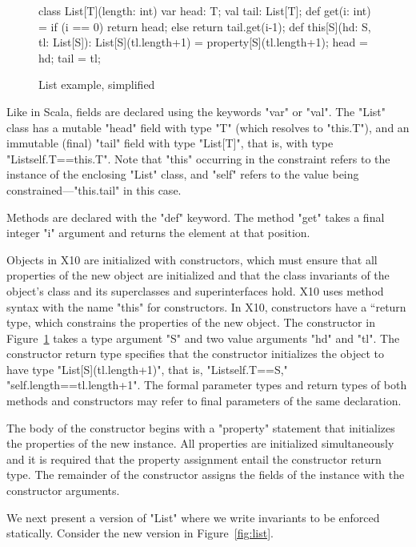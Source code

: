 \begin{figure}
{\footnotesize
\begin{xtennoindent}
class List[T](length: int) {
  var head: T;
  val tail: List[T];
  def get(i: int) = {
    if (i == 0) return head;
    else return tail.get(i-1);
  }
  def this[S](hd: S, tl: List[S]): List[S](tl.length+1) = {
    property[S](tl.length+1);
    head = hd; tail = tl;
  }
}
\end{xtennoindent}
}
\caption{List example, simplified}
\label{fig:list0}
\end{figure}

Like in Scala, fields are declared using the keywords \xcd"var"
or \xcd"val".  The \xcd"List" class has a mutable \xcd"head"
field with type \xcd"T" (which resolves to \xcd"this.T"), and an
immutable (final) \xcd"tail" field with type \xcd"List[T]", that
is, with type \xcd"List{self.T==this.T}".  Note that \xcd"this" occurring
in the constraint refers to the instance of the enclosing
\xcd"List" class,
and \xcd"self" refers to the value being
constrained---\xcd"this.tail" in this case.

Methods are declared with the \xcd"def" keyword.
The method \xcd"get" takes a final integer \xcd"i" argument
and returns the element at that position.

Objects in X10 are initialized with constructors, which
must ensure that all properties of the new object
are initialized and that the class invariants of the object's
class and its superclasses and superinterfaces hold.
X10 uses method syntax with the name
\xcd"this" for constructors.
In X10, constructors have a ``return type, which constrains
the properties of the new object.  The constructor in
Figure~\ref{fig:list0} takes a type argument \xcd"S"
and two value arguments \xcd"hd" and \xcd"tl".  The constructor
return type specifies that the constructor initializes the
object to have type \xcd"List[S](tl.length+1)", that is,
\xcd"List{self.T==S," \xcd"self.length==tl.length+1}".
The formal parameter types and return types of both methods and
constructors may refer to final parameters of the same
declaration.

The body of the constructor
begins with a \xcd"property" statement that initializes the
properties of the new instance.  All properties are initialized
simultaneously and it is required that the property assignment
entail the constructor return type.
The remainder of the constructor assigns the fields of the
instance with the constructor arguments.

We next present a version of \xcd"List" where we write
invariants to be enforced statically.  Consider the new version
in Figure~\ref{fig:list}.

